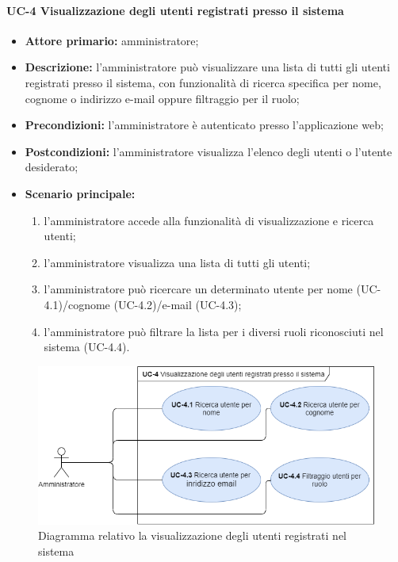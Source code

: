 
\paragraph{UC-4 Visualizzazione degli utenti registrati presso il sistema}

\begin{itemize}
	\item \textbf{Attore primario:} amministratore; 

	\item \textbf{Descrizione:} l'amministratore può visualizzare una lista di tutti gli utenti registrati presso il sistema, con funzionalità di ricerca specifica per nome, cognome o indirizzo e-mail oppure filtraggio per il ruolo;

	\item \textbf{Precondizioni:} l'amministratore è autenticato presso l'applicazione web;

	\item \textbf{Postcondizioni:} l'amministratore visualizza l'elenco degli utenti o l'utente desiderato;

	\item \textbf{Scenario principale:}
	      \begin{enumerate}
		      \item l'amministratore accede alla funzionalità di visualizzazione e ricerca utenti;
		      \item l'amministratore visualizza una lista di tutti gli utenti;
		      \item l'amministratore può ricercare un determinato utente per nome (UC-4.1)/cognome (UC-4.2)/e-mail (UC-4.3);
		      \item l'amministratore può filtrare la lista per i diversi ruoli riconosciuti nel sistema (UC-4.4).
	      \end{enumerate}
\end{itemize}
\begin{figure}[H]
    \centering
      \includegraphics[scale=0.40]{src/CasiDUso/immagini/VisualizzazioneUtenti.png}
    \caption{Diagramma relativo la visualizzazione degli utenti registrati nel sistema}
\end{figure}

